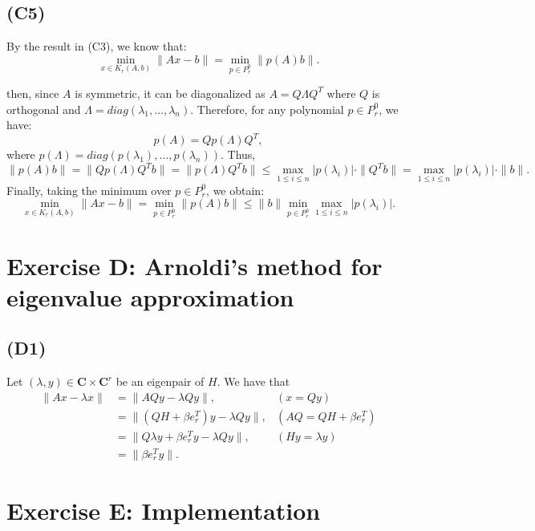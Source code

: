 \documentclass{article}
\begin{document}
\subsection*{(C5)}
By the result in (C3), we know that:
   \[
   \min_{x \in K_r(A, b)} \|Ax - b\| = \min_{p \in P_r^0} \|p(A)b\|.
   \]

then, since $ A $ is symmetric, it can be diagonalized as $ A = Q\Lambda Q^T$ where $ Q $ is orthogonal and $ \Lambda = diag(\lambda_1, \dots, \lambda_n) $.
Therefore, for any polynomial $ p \in P_r^0 $, we have:
   \[
   p(A) = Q p(\Lambda) Q^T,
   \]
   where $ p(\Lambda) = diag(p(\lambda_1), \dots, p(\lambda_n)) $.
 Thus,
   \[
   \|p(A) b\| = \|Q p(\Lambda) Q^T b\| = \|p(\Lambda) Q^T b\| \leq \max_{1 \leq i \leq n} |p(\lambda_i)| \cdot \|Q^T b\| = \max_{1 \leq i \leq n} |p(\lambda_i)| \cdot \|b\|.
   \]
Finally, taking the minimum over $ p \in P_r^0 $, we obtain:
   \[
   \min_{x \in K_r(A, b)} \|Ax - b\| = \min_{p \in P_r^0} \|p(A) b\| \leq \|b\| \min_{p \in P_r^0} \max_{1 \leq i \leq n} |p(\lambda_i)|.
   \]

\section{Exercise D: Arnoldi’s method for eigenvalue approximation}
\subsection*{(D1)}
Let $(\lambda, y) \in \mathbf{C} \times \mathbf{C}^r$ be an eigenpair of $H$. We have that
\begin{align*}
    \|Ax-\lambda x \| & = \|AQy-\lambda Qy \|, & (x=Qy)\\
    &=\|(QH+\beta e_r^T)y-\lambda Qy \|, &  (AQ = QH+\beta e_r^T) \\
    &=\|Q \lambda y+\beta e_r^Ty-\lambda Qy \|, & (Hy=\lambda y)\\
    &=\|\beta e_r^Ty \|. &
\end{align*}
\section{Exercise E: Implementation}
\end{document}
